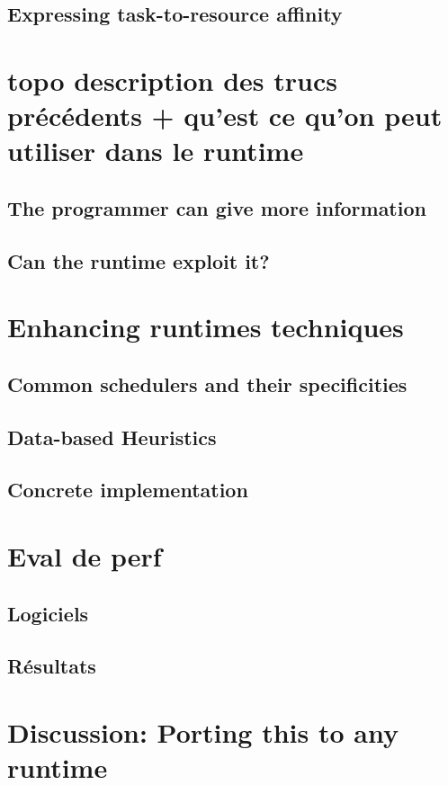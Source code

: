 \subsection{Expressing task-to-resource affinity}

\section{topo description des trucs précédents + qu'est ce qu'on peut utiliser dans le runtime}
\subsection{The programmer can give more information}
\subsection{Can the runtime exploit it?}

\section{Enhancing runtimes techniques}
\subsection{Common schedulers and their specificities}
\subsection{Data-based Heuristics}
\subsection{Concrete implementation}

\section{Eval de perf}
\subsection{Logiciels}
\subsection{Résultats}


\section{Discussion: Porting this to any runtime}
